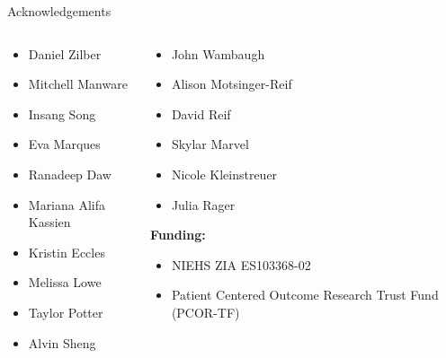 \documentclass[
  ignorenonframetext,
]{beamer}
\providecommand{\tightlist}{%
  \setlength{\itemsep}{0pt}\setlength{\parskip}{0pt}}\usepackage{longtable,booktabs,array}
\begin{document}
\begin{frame}{Acknowledgements}
\label{acknowledgements}
\begin{columns}[T]
\begin{column}{0.5\textwidth}
\begin{itemize}
\tightlist
\item
  Daniel Zilber
\item
  Mitchell Manware
\item
  Insang Song
\item
  Eva Marques
\item
  Ranadeep Daw
\item
  Mariana Alifa Kassien
\item
  Kristin Eccles
\item
  Melissa Lowe
\item
  Taylor Potter
\item
  Alvin Sheng
\end{itemize}
\end{column}

\begin{column}{0.5\textwidth}
\begin{itemize}
\tightlist
\item
  John Wambaugh
\item
  Alison Motsinger-Reif
\item
  David Reif
\item
  Skylar Marvel
\item
  Nicole Kleinstreuer
\item
  Julia Rager
\end{itemize}

\textbf{Funding:}

\begin{itemize}
\item
  NIEHS ZIA ES103368-02
\item
  Patient Centered Outcome Research Trust Fund (PCOR-TF)
\end{itemize}
\end{column}
\end{columns}
\end{frame}
\end{document}
